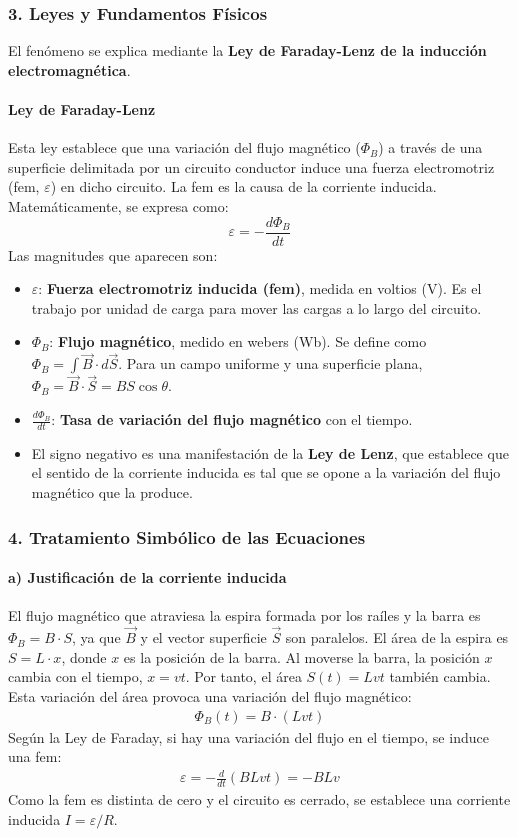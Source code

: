 \subsubsection*{3. Leyes y Fundamentos Físicos}
El fenómeno se explica mediante la \textbf{Ley de Faraday-Lenz de la inducción electromagnética}.

\paragraph*{Ley de Faraday-Lenz}
Esta ley establece que una variación del flujo magnético ($\Phi_B$) a través de una superficie delimitada por un circuito conductor induce una fuerza electromotriz (fem, $\varepsilon$) en dicho circuito. La fem es la causa de la corriente inducida. Matemáticamente, se expresa como:
$$ \varepsilon = - \frac{d\Phi_B}{dt} $$
Las magnitudes que aparecen son:
\begin{itemize}
    \item $\varepsilon$: \textbf{Fuerza electromotriz inducida (fem)}, medida en voltios (V). Es el trabajo por unidad de carga para mover las cargas a lo largo del circuito.
    \item $\Phi_B$: \textbf{Flujo magnético}, medido en webers (Wb). Se define como $\Phi_B = \int \vec{B} \cdot d\vec{S}$. Para un campo uniforme y una superficie plana, $\Phi_B = \vec{B} \cdot \vec{S} = B S \cos\theta$.
    \item $\frac{d\Phi_B}{dt}$: \textbf{Tasa de variación del flujo magnético} con el tiempo.
    \item El signo negativo es una manifestación de la \textbf{Ley de Lenz}, que establece que el sentido de la corriente inducida es tal que se opone a la variación del flujo magnético que la produce.
\end{itemize}

\subsubsection*{4. Tratamiento Simbólico de las Ecuaciones}
\paragraph*{a) Justificación de la corriente inducida}
El flujo magnético que atraviesa la espira formada por los raíles y la barra es $\Phi_B = B \cdot S$, ya que $\vec{B}$ y el vector superficie $\vec{S}$ son paralelos.
El área de la espira es $S = L \cdot x$, donde $x$ es la posición de la barra.
Al moverse la barra, la posición $x$ cambia con el tiempo, $x=vt$. Por tanto, el área $S(t) = Lvt$ también cambia.
Esta variación del área provoca una variación del flujo magnético:
\begin{gather}
    \Phi_B(t) = B \cdot (L v t)
\end{gather}
Según la Ley de Faraday, si hay una variación del flujo en el tiempo, se induce una fem:
\begin{gather}
    \varepsilon = - \frac{d}{dt} (B L v t) = -BLv
\end{gather}
Como la fem es distinta de cero y el circuito es cerrado, se establece una corriente inducida $I = \varepsilon/R$.

